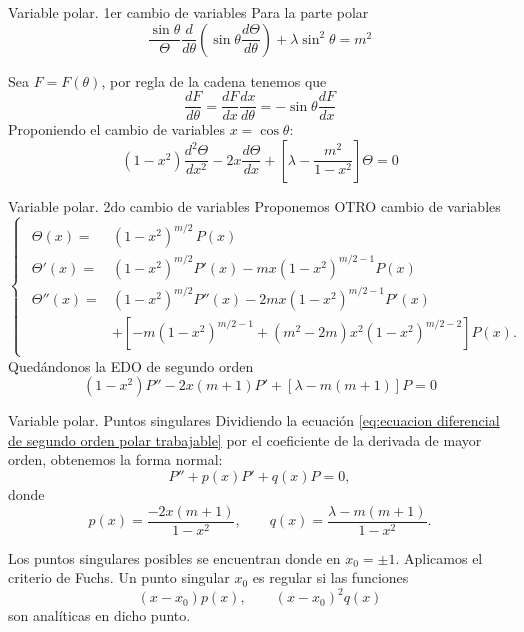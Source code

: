 \begin{frame}{Variable polar. 1er cambio de variables}
	Para la parte polar
	\[
    	\frac{\sin{\theta}}{\Theta}\frac{d}{d\theta} \left( \sin{\theta} \frac{d\Theta}{d\theta}\right)+\lambda \sin^2{\theta} = m^2 
	\]

	Sea \(F = F(\theta)\), por regla de la cadena tenemos que 
	\[
		\frac{dF}{d\theta} = \frac{dF}{dx}\frac{dx}{d\theta}=-\sin{\theta}\frac{dF}{dx}
	\]
	Proponiendo el cambio de variables $x = \cos{\theta}$:
	\begin{equation}
		\left( 1-x^2\right) \frac{d^2\Theta}{dx^2}-2x\frac{d\Theta}{dx}+ \left[ \lambda -\frac{m^2}{1-x^2}\right]\Theta =0
		 \label{eq:ecuación diferencial de segundo orden de Theta}
	\end{equation}
\end{frame}

\begin{frame}{Variable polar. 2do cambio de variables}
	Proponemos OTRO cambio de variables
	\begin{equation}
		\begin{cases}
			 \begin{aligned}
				\Theta(x) =& \left(1-x^2\right)^{m/2} \, P(x) \\
				\Theta'(x) =& \left(1-x^2\right)^{m/2}P'(x)-mx\left(1-x^2\right)^{m/2-1}P(x)\\
				\Theta''(x) =& \left(1-x^2\right)^{m/2}P''(x)-2mx\left(1-x^2\right)^{m/2-1}P'(x)    \\ 
				&+ \left[-m\left(1-x^2\right)^{m/2-1}+(m^2-2m)x^2\left(1-x^2\right)^{m/2-2}\right]P(x).
			\end{aligned}   
		\end{cases}
		\label{eq:cambio de variables de Theta a P}
	\end{equation}
	Quedándonos la EDO de segundo orden
	\begin{equation}
		\left(1-x^2 \right)P'' - 2x(m+1)P' + \left[\lambda-m(m+1)\right]P = 0
		\label{eq:ecuacion diferencial de segundo orden polar trabajable}
	\end{equation}
\end{frame}

\begin{frame}{Variable polar. Puntos singulares}
	Dividiendo la ecuación \ref{eq:ecuacion diferencial de segundo orden polar trabajable} por el coeficiente de la derivada de mayor orden, obtenemos la forma normal:
    \[
        P''+p(x)P'+q(x)P=0,
    \]
    donde
    \[
        p(x)=\frac{-2x(m+1)}{1-x^2},
        \qquad
        q(x)=\frac{\lambda-m(m+1)}{1-x^2}.
    \]

    Los puntos singulares posibles se encuentran donde en $x_0=\pm 1$.
    Aplicamos el criterio de Fuchs. Un punto singular $x_0$
    es regular si las funciones
    \[
        (x-x_0)p(x),
        \qquad
        (x-x_0)^2q(x)
    \]
    son analíticas en dicho punto.
\end{frame}

